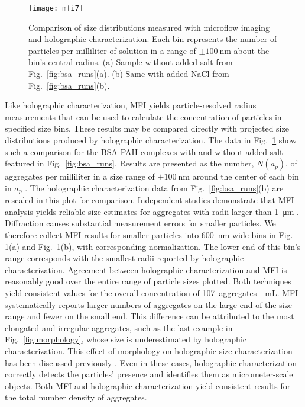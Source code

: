 \begin{figure}[!t]
  \centering
  \texttt{[image: mfi7]}
	\caption[Microflow imaging results]
    {Comparison of size distributions measured with microflow imaging and 
    holographic characterization. Each bin represents the number of particles 
    per milliliter of solution in a range of $\pm \SI{100}{\nm}$ about the bin’s central 
    radius. (a) Sample without added salt from Fig.~\ref{fig:bsa_runs}(a). (b) Same with 
    added NaCl from Fig.~\ref{fig:bsa_runs}(b).}
	\label{fig:mfi}
\end{figure}

Like holographic characterization, MFI yields particle-resolved radius measurements 
that can be used to calculate the concentration of particles in specified size bins.
These results may be compared directly with projected size distributions produced by 
holographic characterization. The data in Fig.~\ref{fig:mfi} show such a comparison for 
the BSA-PAH complexes with and without added salt featured in Fig.~\ref{fig:bsa_runs}.
Results are presented as the number, $N(a_p)$, of aggregates per milliliter in a size 
range of $\pm \SI{100}{\nm}$ around the center of each bin in $a_p$ . The holographic 
characterization data from Fig.~\ref{fig:bsa_runs}(b) are rescaled in this plot for 
comparison. Independent studies demonstrate that MFI analysis yields reliable size 
estimates for aggregates with radii larger than \SI{1}{\um} \cite{weinbuch13, zolls13}. 
Diffraction causes substantial measurement errors for smaller particles. We therefore 
collect MFI results for smaller particles into \SI{600}{\nm}-wide bins in Fig.~
\ref{fig:mfi}(a) and Fig.~\ref{fig:mfi}(b), with corresponding normalization. The lower 
end of this bin’s range corresponds with the smallest radii reported by holographic 
characterization. Agreement between holographic characterization and MFI is reasonably 
good over the entire range of particle sizes plotted. Both techniques yield consistent 
values for the overall concentration of \SI{107}{aggregates \per \mL}. MFI systematically 
reports larger numbers of aggregates on the large end of the size range and fewer on the 
small end. This difference can be attributed to the most elongated and irregular 
aggregates, such as the last example in Fig.~\ref{fig:morphology}, whose size is 
underestimated by holographic characterization. This effect of morphology on holographic 
size characterization has been discussed previously \cite{hannel15}. Even in these cases, 
holographic characterization correctly detects the particles’ presence and identifies 
them as micrometer-scale objects. Both MFI and holographic characterization yield 
consistent results for the total number density of aggregates.


